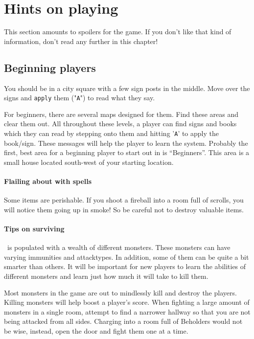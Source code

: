 
\chapter{Hints on playing \cf}

This section amounts to spoilers for the game. If you don't like
that kind of information, don't read any further in this chapter!

\section{Beginning players}\label{sec:first}

You should be in a city square with a few sign posts in the middle.
Move over the signs and {\tt apply} them ("{\tt A}") to read what they say.

For beginners, there are several maps designed for them. Find these areas
and clear them out. All throughout these levels, a player can find signs and
books which they can read by stepping onto them and hitting '{\tt A}' to apply the
book/sign. These messages will help the player to learn the system.
Probably the first, best area for a beginning player to start out in
is ``Beginners''. This area is a small house located south-west of your
starting location.

\subsubsection{Flailing about with spells}
Some items are perishable. If you shoot a
fireball into a room full of scrolls, you will notice them
going up in smoke! So be careful not to destroy valuable items.

\subsubsection{Tips on surviving}
\cf\ is populated with a wealth of different monsters. These monsters
can have varying immunities and attacktypes. In addition, some of them can
be quite a bit smarter than others. It will be important for new players to
learn the abilities of different monsters and learn just how much it will
take to kill them.

Most monsters in the game are out to mindlessly kill and destroy the
players. Killing monsters will help boost a player's score.
When fighting a large amount of monsters in a single room, attempt to
find a narrower hallway so that you are not being attacked from all sides.
Charging into a room full of Beholders would not be wise,
instead, open the door and fight them one at a time.

